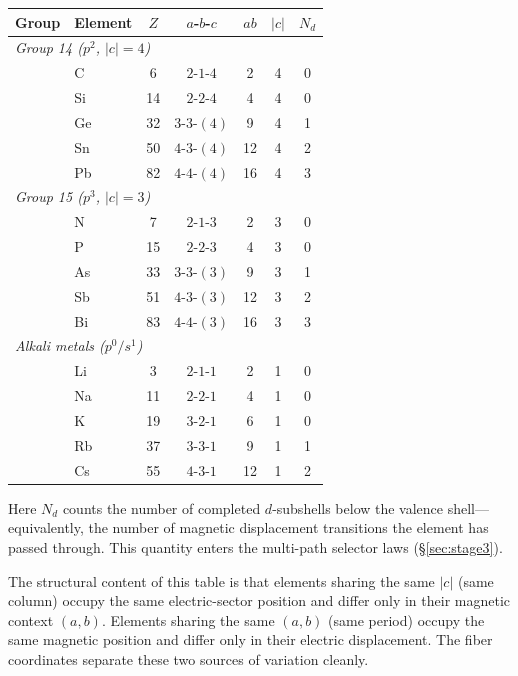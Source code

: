 \documentclass[11pt,a4paper]{article}
\begin{document}
\begin{center}
\renewcommand{\arraystretch}{1.15}
\begin{tabular}{llccccc}
\toprule
Group & Element & $Z$ & $a$-$b$-$c$ & $ab$ & $|c|$ & $N_d$ \\
\midrule
\multicolumn{7}{l}{\emph{Group 14 ($p^2$, $|c| = 4$)}} \\
 & C  &  6 & $2$-$1$-$4$   & 2 & 4 & 0 \\
 & Si & 14 & $2$-$2$-$4$   & 4 & 4 & 0 \\
 & Ge & 32 & $3$-$3$-$(4)$ & 9 & 4 & 1 \\
 & Sn & 50 & $4$-$3$-$(4)$ & 12 & 4 & 2 \\
 & Pb & 82 & $4$-$4$-$(4)$ & 16 & 4 & 3 \\
\midrule
\multicolumn{7}{l}{\emph{Group 15 ($p^3$, $|c| = 3$)}} \\
 & N  &  7 & $2$-$1$-$3$   & 2 & 3 & 0 \\
 & P  & 15 & $2$-$2$-$3$   & 4 & 3 & 0 \\
 & As & 33 & $3$-$3$-$(3)$ & 9 & 3 & 1 \\
 & Sb & 51 & $4$-$3$-$(3)$ & 12 & 3 & 2 \\
 & Bi & 83 & $4$-$4$-$(3)$ & 16 & 3 & 3 \\
\midrule
\multicolumn{7}{l}{\emph{Alkali metals ($p^0 / s^1$)}} \\
 & Li &  3 & $2$-$1$-$1$   & 2 & 1 & 0 \\
 & Na & 11 & $2$-$2$-$1$   & 4 & 1 & 0 \\
 & K  & 19 & $3$-$2$-$1$   & 6 & 1 & 0 \\
 & Rb & 37 & $3$-$3$-$1$   & 9 & 1 & 1 \\
 & Cs & 55 & $4$-$3$-$1$   & 12 & 1 & 2 \\
\bottomrule
\end{tabular}
\end{center}

Here $N_d$ counts the number of completed $d$-subshells below the valence shell---equivalently, the number of magnetic displacement transitions the element has passed through. This quantity enters the multi-path selector laws (\S\ref{sec:stage3}).

The structural content of this table is that elements sharing the same $|c|$ (same column) occupy the same electric-sector position and differ only in their magnetic context $(a, b)$. Elements sharing the same $(a, b)$ (same period) occupy the same magnetic position and differ only in their electric displacement. The fiber coordinates separate these two sources of variation cleanly.
\end{document}

